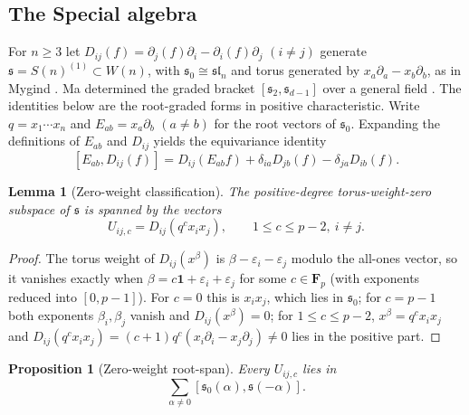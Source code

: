 \documentclass[11pt,reqno]{amsart}
\newtheorem{proposition}[proposition]{Proposition}
\newtheorem{lemma}[lemma]{Lemma}
\theoremstyle{definition}
\theoremstyle{remark}
\theoremstyle{definition}
\newcommand{\Fp}{\mathbf F_p}
\begin{document}
\subsection{The Special algebra}

For $n\ge3$ let $D_{ij}(f)=\partial_j(f)\partial_i-\partial_i(f)\partial_j$
$(i\ne j)$ generate $\mathfrak s=S(n)^{(1)}\subset W(n)$, with
$\mathfrak s_0\cong\mathfrak{sl}_n$ and torus generated by
$x_a\partial_a-x_b\partial_b$, as in Mygind
\cite[Section~2]{Mygind2014}. Ma determined the graded bracket
$[\mathfrak s_2,\mathfrak s_{d-1}]$ over a general field
\cite{Ma2026Divergence}. The identities below are the root-graded forms
in positive characteristic. Write
$q=x_1\cdots x_n$ and $E_{ab}=x_a\partial_b$ $(a\ne b)$ for the root vectors
of $\mathfrak s_0$.  Expanding the definitions of $E_{ab}$ and $D_{ij}$
yields the equivariance identity
\begin{equation}\label{eq:special-equiv}
 [E_{ab},D_{ij}(f)]=D_{ij}(E_{ab}f)+\delta_{ia}D_{jb}(f)-\delta_{ja}D_{ib}(f).
\end{equation}

\begin{lemma}[Zero-weight classification]\label{lem:special-zero-weight}
The positive-degree torus-weight-zero subspace of $\mathfrak s$ is
spanned by the vectors
\[
 U_{ij,c}=D_{ij}(q^cx_ix_j),\qquad 1\le c\le p-2,\ i\ne j.
\]
\end{lemma}

\begin{proof}
The torus weight of $D_{ij}(x^\beta)$ is $\beta-\varepsilon_i-\varepsilon_j$
modulo the all-ones vector, so it vanishes exactly when
$\beta=c\mathbf1+\varepsilon_i+\varepsilon_j$ for some $c\in\Fp$ (with
exponents reduced into $[0,p-1]$).  For $c=0$ this is $x_ix_j$, which lies
in $\mathfrak s_0$; for $c=p-1$ both exponents $\beta_i,\beta_j$ vanish and
$D_{ij}(x^\beta)=0$; for $1\le c\le p-2$, $x^\beta=q^cx_ix_j$ and
$D_{ij}(q^cx_ix_j)=(c+1)q^c(x_i\partial_i-x_j\partial_j)\ne0$ lies in the
positive part.
\end{proof}

\begin{proposition}[Zero-weight root-span]\label{prop:special-root-span}
Every $U_{ij,c}$ lies in
\[
 \sum_{\alpha\ne0}[\mathfrak s_0(\alpha),\mathfrak s(-\alpha)].
\]
\end{proposition}
\end{document}
